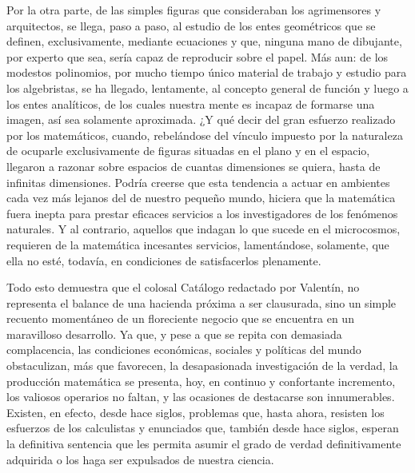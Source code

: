 \documentclass[a4paper, 12pt, draft]{article}
\begin{document}
{{Por la otra parte, de las simples figuras que consideraban los agrimensores y arquitectos, se llega, paso a paso, al estudio de los entes geométricos que se definen, exclusivamente, mediante ecuaciones y que, ninguna mano de dibujante, por experto que sea, sería capaz de reproducir sobre el papel. Más aun: de los modestos polinomios, por mucho tiempo único material de trabajo y estudio para los algebristas, se ha llegado, lentamente, al concepto general de función y luego a los entes analíticos, de los cuales nuestra mente es incapaz de formarse una imagen, así sea solamente aproximada. ¿Y qué decir del gran esfuerzo realizado por los matemáticos, cuando, rebelándose del vínculo impuesto por la naturaleza de ocuparle exclusivamente de figuras situadas en el plano y en el espacio, llegaron a razonar sobre espacios de cuantas dimensiones se quiera, hasta de infinitas dimensiones.
Podría creerse que esta tendencia a actuar en ambientes cada vez más lejanos del de nuestro pequeño mundo, hiciera que la matemática fuera inepta para prestar eficaces servicios a los investigadores de los fenómenos naturales. Y al contrario, aquellos que indagan lo que sucede en el microcosmos, requieren de la matemática incesantes servicios, lamentándose, solamente, que ella no esté, todavía, en condiciones de satisfacerlos plenamente.




Todo esto demuestra que el colosal Catálogo redactado por Valentín, no representa el balance de una hacienda próxima a ser clausurada, sino un simple recuento momentáneo de un floreciente negocio que se encuentra en un maravilloso desarrollo. Ya que, y pese a que se repita con demasiada complacencia, las condiciones económicas, sociales y políticas del mundo obstaculizan, más que favorecen, la desapasionada investigación de la verdad, la producción matemática se presenta, hoy, en continuo y confortante incremento, los valiosos operarios no faltan, y las ocasiones de destacarse son innumerables. Existen, en efecto, desde hace siglos, problemas que, hasta ahora, resisten los esfuerzos de los calculistas y enunciados que, también desde hace siglos, esperan la definitiva sentencia que les permita asumir el grado de verdad definitivamente adquirida o los haga ser expulsados de nuestra ciencia.

}}
\end{document}
